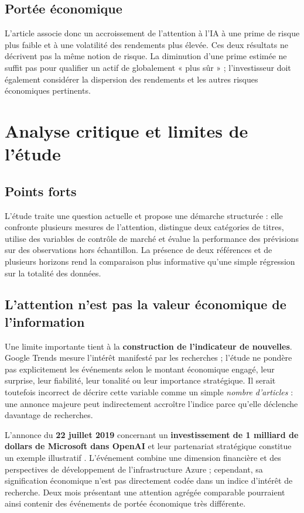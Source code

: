 \documentclass[11pt,a4paper]{article}
\begin{document}
\subsection{Portée économique}
L'article associe donc un accroissement de l'attention à l'IA à une prime de risque plus faible et à une volatilité des rendements plus élevée. Ces deux résultats ne décrivent pas la même notion de risque. La diminution d'une prime estimée ne suffit pas pour qualifier un actif de globalement « plus sûr » ; l'investisseur doit également considérer la dispersion des rendements et les autres risques économiques pertinents.

\section{Analyse critique et limites de l'étude}
\subsection{Points forts}
L'étude traite une question actuelle et propose une démarche structurée : elle confronte plusieurs mesures de l'attention, distingue deux catégories de titres, utilise des variables de contrôle de marché et évalue la performance des prévisions sur des observations hors échantillon. La présence de deux références et de plusieurs horizons rend la comparaison plus informative qu'une simple régression sur la totalité des données.

\subsection{L'attention n'est pas la valeur économique de l'information}
Une limite importante tient à la \textbf{construction de l'indicateur de nouvelles}. Google Trends mesure l'intérêt manifesté par les recherches ; l'étude ne pondère pas explicitement les événements selon le montant économique engagé, leur surprise, leur fiabilité, leur tonalité ou leur importance stratégique. Il serait toutefois incorrect de décrire cette variable comme un simple \emph{nombre d'articles} : une annonce majeure peut indirectement accroître l'indice parce qu'elle déclenche davantage de recherches.

L'annonce du \textbf{22 juillet 2019} concernant un \textbf{investissement de 1 milliard de dollars de Microsoft dans OpenAI} et leur partenariat stratégique constitue un exemple illustratif \cite{Microsoft2019,OpenAI2019}. L'événement combine une dimension financière et des perspectives de développement de l'infrastructure Azure ; cependant, sa signification économique n'est pas directement codée dans un indice d'intérêt de recherche. Deux mois présentant une attention agrégée comparable pourraient ainsi contenir des événements de portée économique très différente.
\end{document}

